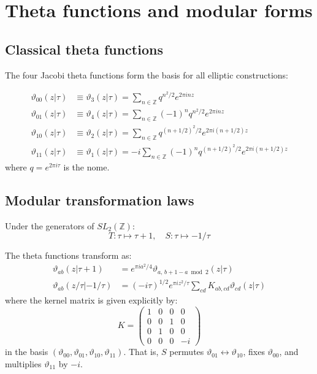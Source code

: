 
\section{Theta functions and modular forms}
\label{app:theta}

\subsection{Classical theta functions}

The four Jacobi theta functions form the basis for all elliptic constructions:

\begin{definition}
\begin{align}
\vartheta_{00}(z|\tau) &\equiv \vartheta_3(z|\tau) = \sum_{n \in \mathbb{Z}} q^{n^2/2} e^{2\pi inz} \\
\vartheta_{01}(z|\tau) &\equiv \vartheta_4(z|\tau) = \sum_{n \in \mathbb{Z}}(-1)^n q^{n^2/2} e^{2\pi inz} \\
\vartheta_{10}(z|\tau) &\equiv \vartheta_2(z|\tau) = \sum_{n \in \mathbb{Z}} q^{(n+1/2)^2/2} e^{2\pi i(n+1/2)z} \\
\vartheta_{11}(z|\tau) &\equiv \vartheta_1(z|\tau) = -i\sum_{n \in \mathbb{Z}}(-1)^n q^{(n+1/2)^2/2} e^{2\pi i(n+1/2)z}
\end{align}
where $q = e^{2\pi i\tau}$ is the nome.
\end{definition}

\subsection{Modular transformation laws}

Under the generators of $SL_2(\mathbb{Z})$:
\[T: \tau \mapsto \tau + 1, \quad S: \tau \mapsto -1/\tau\]

The theta functions transform as:
\begin{align}
\vartheta_{ab}(z|\tau+1) &= e^{\pi ia^2/4} \vartheta_{a,\, b+1-a \bmod 2}(z|\tau) \\
\vartheta_{ab}(z/\tau|-1/\tau) &= (-i\tau)^{1/2} e^{\pi iz^2/\tau} \sum_{cd} K_{ab,cd} \vartheta_{cd}(z|\tau)
\end{align}
where the kernel matrix is given explicitly by:
\[K = \begin{pmatrix} 1 & 0 & 0 & 0 \\ 0 & 0 & 1 & 0 \\ 0 & 1 & 0 & 0 \\ 0 & 0 & 0 & -i \end{pmatrix}\]
in the basis $(\vartheta_{00}, \vartheta_{01}, \vartheta_{10}, \vartheta_{11})$. That is, $S$ permutes $\vartheta_{01} \leftrightarrow \vartheta_{10}$, fixes $\vartheta_{00}$, and multiplies $\vartheta_{11}$ by $-i$.

